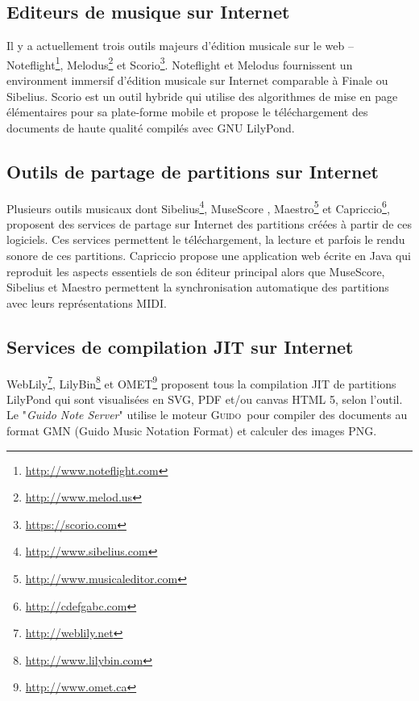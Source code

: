 \documentclass{article}
\newcommand{\guido}		{\textsc{Guido}}
\begin{document}
\subsection{Editeurs de musique sur Internet}\label{subsection:editor}
Il y a actuellement trois outils majeurs d'édition musicale sur le web -- Noteflight\footnote{\url{http://www.noteflight.com}}, Melodus\footnote{\url{http://www.melod.us}} et Scorio\footnote{\url{https://scorio.com}}. Noteflight et Melodus fournissent un environment immersif d'édition musicale sur Internet comparable à Finale ou Sibelius. Scorio est un outil hybride qui utilise des algorithmes de mise en page élémentaires pour sa plate-forme mobile et propose le téléchargement des documents de haute qualité compilés avec GNU LilyPond.

\subsection{Outils de partage de partitions sur Internet}\label{subsection:sharing}
Plusieurs outils musicaux dont Sibelius\footnote{\url{http://www.sibelius.com}}, Muse\-Score \cite{musescore}, Maestro\footnote{\url{http://www.musicaleditor.com}} et Capriccio\footnote{\url{http://cdefgabc.com}}, proposent des services de partage sur Internet des partitions créées à partir de ces logiciels. Ces services permettent le téléchargement, la lecture et parfois le rendu sonore de ces partitions. Capriccio propose une application web écrite en Java qui reproduit les aspects essentiels de son éditeur principal alors que MuseScore, Sibelius et Maestro permettent la synchronisation automatique des partitions avec leurs représentations MIDI.

\subsection{Services de compilation JIT sur Internet}\label{subsection:jit}
WebLily\footnote{\url{http://weblily.net}}, LilyBin\footnote{\url{http://www.lilybin.com}} et OMET\footnote{\url{http://www.omet.ca}} proposent tous la compilation JIT de partitions LilyPond qui sont visualisées en SVG, PDF et/ou canvas HTML 5, selon l'outil. Le "\emph{Guido Note Server}" \cite{renz98} utilise le moteur \guido\ pour compiler des documents au format GMN (Guido Music Notation Format) \cite{hoos98} et calculer des images PNG.
\end{document}
